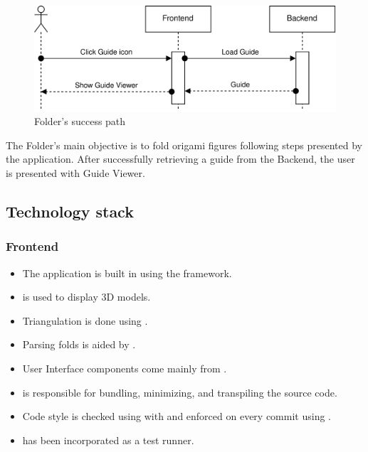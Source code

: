 \clearpage

\begin{figure}[H]
	\caption{Folder's success path}
  \centering
    \includegraphics[width=1\textwidth]{assets/3-folder-flow.png}
\end{figure}

The Folder's main objective is to fold origami figures following steps presented by the application. After successfully retrieving a guide from the Backend, the user is presented with Guide Viewer.

\subsection{Technology stack}

\subsubsection{Frontend}

\begin{itemize}
	\item The application is built in  using the  framework. 
	\item {} is used to display 3D models.
	\item Triangulation is done using . 
	\item Parsing folds is aided by .
	\item User Interface components come mainly from .
	\item {} is responsible for bundling, minimizing, and transpiling the source code.
	\item Code style is checked using  with  and enforced on every commit using .
	\item {} has been incorporated as a test runner.
\end{itemize}

